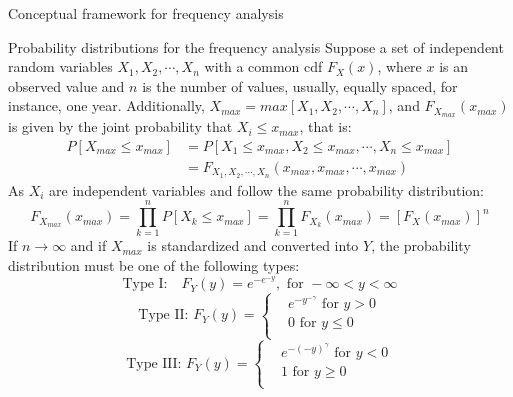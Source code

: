 \documentclass[8pt]{beamer}
\renewcommand{\emph}[1]{\textcolor{myorange}{#1}}
\begin{document}
\begin{frame}{Conceptual framework for  frequency analysis}
    \begin{block}{Probability distributions for the frequency analysis}
        Suppose a set of independent random variables $X_1, X_2, \cdots, X_n$  with a common \emph{cdf} $F_X (x)$, where $x$ is an observed value and $n$ is the number of values, usually, equally spaced, for instance, one year. Additionally, $X_{max} = max[X_1 , X_2 , \cdots, X_n ]$, and $F_{X_{max}} (x_{max})$ is given by the joint probability that $X_i \leq x_{max}$, that is:
        \begin{align*}
            P[X_{max} \leq x_{max}] &= P[X_1 \leq x_{max}, X_2 \leq x_{max}, \cdots, X_n \leq x_{max}] \\
                                    &=F_{X_1, X_2, \cdots, X_n} (x_{max}, x_{max},\cdots, x_{max})
        \end{align*}
        As $X_i$ are independent variables and follow the same probability distribution:
        \[
            F_{X_{max}} (x_{max}) = \prod_{k=1}^n P[X_k \leq x_{max} ] = \prod_{k=1}^n F_{X_k} (x_{max}) = \left[  F_{X} (x_{max}) \right]^n
        \]
        If $n \rightarrow \infty$ and if $X_{max}$ is standardized and converted into $Y$, the probability distribution must be one of the following types:
        \[
            \text{Type I:} \quad F_Y (y) = e^{-e^{-y}}, \text{ for } -\infty < y < \infty 
        \]
 \[
     \text{Type II: } F_Y (y) =
\begin{cases}
    &e^{-y^{-\gamma}} \text{ for } y > 0   \\
    &0 \text{ for } y \leq 0   \\
\end{cases}
\]
 \[
     \text{Type III: } F_Y (y) =
\begin{cases}
    &e^{-(-y)^{\gamma}} \text{ for } y < 0   \\
    &1 \text{ for } y \geq 0   \\
\end{cases}
\]
  \end{block}
\end{frame}
\end{document}
